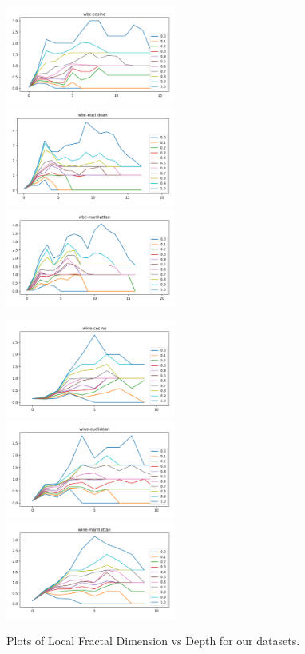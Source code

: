 \begin{figure}[!t]
\includegraphics[width=2.2in]{kdd/static/lfd_vs_depth/wbc-cosine.png}
\includegraphics[width=2.2in]{kdd/static/lfd_vs_depth/wbc-euclidean.png}
\includegraphics[width=2.2in]{kdd/static/lfd_vs_depth/wbc-manhattan.png}

\includegraphics[width=2.2in]{kdd/static/lfd_vs_depth/wine-cosine.png}
\includegraphics[width=2.2in]{kdd/static/lfd_vs_depth/wine-euclidean.png}
\includegraphics[width=2.2in]{kdd/static/lfd_vs_depth/wine-manhattan.png}

\caption{
Plots of Local Fractal Dimension vs Depth for our datasets.
}

\label{results:lfd_3}
\end{figure}

